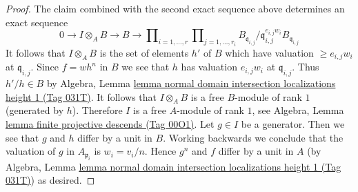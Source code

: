 \documentclass{amsart}
\theoremstyle{plain}
\theoremstyle{definition}
\theoremstyle{remark}
\numberwithin{equation}{subsection}
\begin{document}
\begin{proof}
\medskip\noindent
The claim combined with the second exact sequence above
determines an exact sequence
$$
0 \to I \otimes_A B \to B \to
\prod\nolimits_{i = 1, \ldots, r}
\prod\nolimits_{j = 1, \ldots, r_i}
B_{\mathfrak q_{i, j}}/\mathfrak q_{i, j}^{e_{i, j}w_i}B_{\mathfrak q_{i, j}}
$$
It follows that $I \otimes_A B$ is the set of elements $h'$ of $B$
which have valuation $\geq e_{i, j}w_i$ at $\mathfrak q_{i, j}$.
Since $f = wh^n$ in $B$ we see that $h$ has valuation
$e_{i, j}w_i$ at $\mathfrak q_{i, j}$. Thus $h'/h \in B$
by Algebra, Lemma
\href{https://stacks.math.columbia.edu/tag/031T}{lemma normal domain intersection localizations height 1 (Tag 031T)}.
It follows that $I \otimes_A B$ is a free $B$-module of rank $1$
(generated by $h$).
Therefore $I$ is a free $A$-module of rank $1$, see
Algebra, Lemma \href{https://stacks.math.columbia.edu/tag/00O1}{lemma finite projective descends (Tag 00O1)}.
Let $g \in I$ be a generator. Then we see that
$g$ and $h$ differ by a unit in $B$. Working backwards we
conclude that the valuation of $g$ in $A_{\mathfrak p_i}$ is
$w_i = v_i/n$. Hence $g^n$ and $f$ differ by a unit in $A$
(by Algebra, Lemma
\href{https://stacks.math.columbia.edu/tag/031T}{lemma normal domain intersection localizations height 1 (Tag 031T)})
as desired.
\end{proof}
\end{document}
